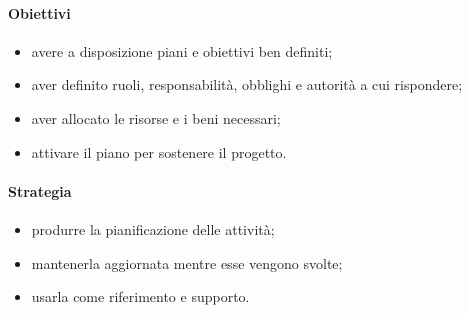 		\paragraph{Obiettivi}
		\begin{itemize}
			\item avere a disposizione piani e obiettivi ben definiti;
			\item aver definito ruoli, responsabilità, obblighi e autorità a cui rispondere;
			\item aver allocato le risorse e i beni necessari;
			\item attivare il piano per sostenere il progetto.
		\end{itemize}	
		\paragraph{Strategia}
		\begin{itemize}
			\item produrre la pianificazione delle attività;
			\item mantenerla aggiornata mentre esse vengono svolte;
			\item usarla come riferimento e supporto.
		\end{itemize}		
